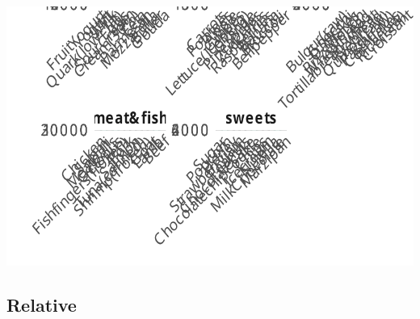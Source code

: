 \documentclass[
  letterpaper,
  DIV=11,
  numbers=noendperiod]{scrartcl}
\begin{document}
\includegraphics{items_files/figure-pdf/unnamed-chunk-6-1.pdf}

\subsection{Relative}
\end{document}
